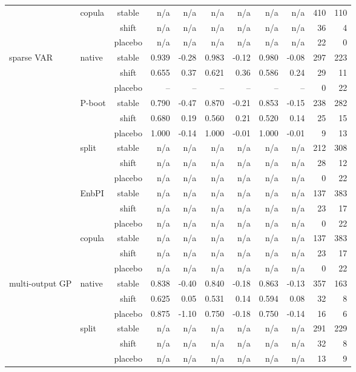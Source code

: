 {\begin{longtable}{@{}llcrrrrrrrr@{}}
 & copula & stable & n/a & n/a & n/a & n/a & n/a & n/a & 410 & 110 \\
 &  & shift & n/a & n/a & n/a & n/a & n/a & n/a & 36 & 4 \\
 &  & placebo & n/a & n/a & n/a & n/a & n/a & n/a & 22 & 0 \\
\addlinespace[2pt]
sparse VAR & native & stable & 0.939 & -0.28 & 0.983 & -0.12 & 0.980 & -0.08 & 297 & 223 \\
 &  & shift & 0.655 & 0.37 & 0.621 & 0.36 & 0.586 & 0.24 & 29 & 11 \\
 &  & placebo & -- & -- & -- & -- & -- & -- & 0 & 22 \\
 & P-boot & stable & 0.790 & -0.47 & 0.870 & -0.21 & 0.853 & -0.15 & 238 & 282 \\
 &  & shift & 0.680 & 0.19 & 0.560 & 0.21 & 0.520 & 0.14 & 25 & 15 \\
 &  & placebo & 1.000 & -0.14 & 1.000 & -0.01 & 1.000 & -0.01 & 9 & 13 \\
 & split & stable & n/a & n/a & n/a & n/a & n/a & n/a & 212 & 308 \\
 &  & shift & n/a & n/a & n/a & n/a & n/a & n/a & 28 & 12 \\
 &  & placebo & n/a & n/a & n/a & n/a & n/a & n/a & 0 & 22 \\
 & EnbPI & stable & n/a & n/a & n/a & n/a & n/a & n/a & 137 & 383 \\
 &  & shift & n/a & n/a & n/a & n/a & n/a & n/a & 23 & 17 \\
 &  & placebo & n/a & n/a & n/a & n/a & n/a & n/a & 0 & 22 \\
 & copula & stable & n/a & n/a & n/a & n/a & n/a & n/a & 137 & 383 \\
 &  & shift & n/a & n/a & n/a & n/a & n/a & n/a & 23 & 17 \\
 &  & placebo & n/a & n/a & n/a & n/a & n/a & n/a & 0 & 22 \\
\addlinespace[2pt]
multi-output GP & native & stable & 0.838 & -0.40 & 0.840 & -0.18 & 0.863 & -0.13 & 357 & 163 \\
 &  & shift & 0.625 & 0.05 & 0.531 & 0.14 & 0.594 & 0.08 & 32 & 8 \\
 &  & placebo & 0.875 & -1.10 & 0.750 & -0.18 & 0.750 & -0.14 & 16 & 6 \\
 & split & stable & n/a & n/a & n/a & n/a & n/a & n/a & 291 & 229 \\
 &  & shift & n/a & n/a & n/a & n/a & n/a & n/a & 32 & 8 \\
 &  & placebo & n/a & n/a & n/a & n/a & n/a & n/a & 13 & 9 \\

\end{longtable}}

